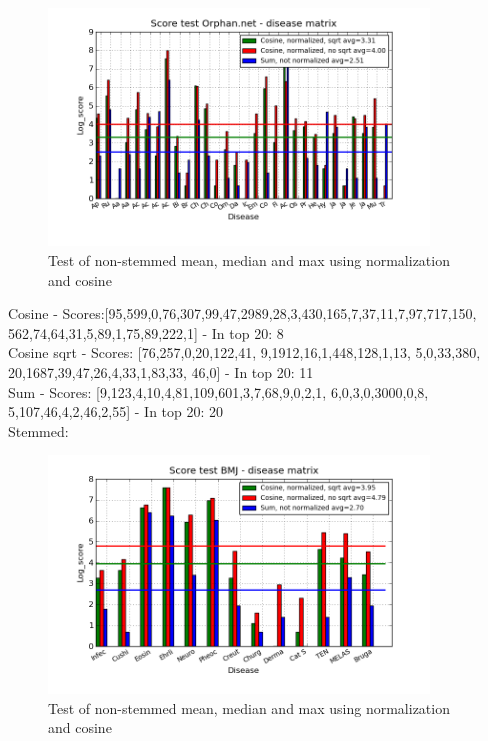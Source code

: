 \begin{figure}[h!]
        \begin{center}
          \includegraphics[width=0.9\textwidth]{barcharts/diseaseMatrix_orphan_hist_NOTnorm_3000_ns_cos_sqrt_cos_sum_nn.png}
        \end{center}
        \caption{Test of non-stemmed mean, median and max using normalization and cosine}
        \label{diseaseMatrix_orphan_hist_NOTnorm_3000_ns_cos_sqrt_cos_sum_nn}
\end{figure}
 
Cosine - Scores:[95,599,0,76,307,99,47,2989,28,3,430,165,7,37,11,7,97,717,150, 562,74,64,31,5,89,1,75,89,222,1] - In top 20: 8 \\
Cosine sqrt - Scores: [76,257,0,20,122,41, 9,1912,16,1,448,128,1,13, 5,0,33,380, 20,1687,39,47,26,4,33,1,83,33, 46,0] - In top 20: 11 \\
Sum - Scores: [9,123,4,10,4,81,109,601,3,7,68,9,0,2,1, 6,0,3,0,3000,0,8, 5,107,46,4,2,46,2,55] - In top 20: 20 \\

Stemmed:

\begin{figure}[h!]
        \begin{center}
          \includegraphics[width=0.9\textwidth]{barcharts/diseaseMatrix_bmj_hist_norm_3000_s_cos_sqrt_cos_sum_nn.png}
        \end{center}
        \caption{Test of non-stemmed mean, median and max using normalization and cosine}
        \label{diseaseMatrix_bmj_hist_norm_3000_s_cos_sqrt_cos_sum_nn}
\end{figure}

